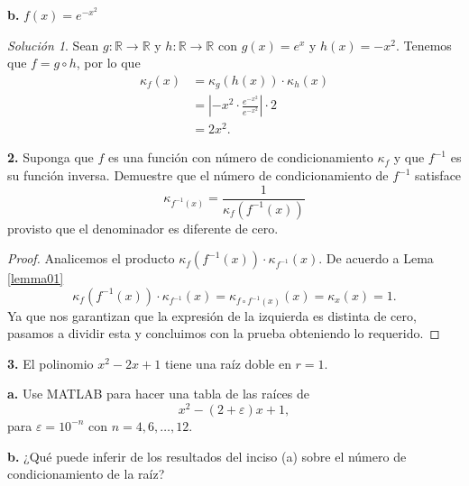 \documentclass{article}
\newenvironment{statement}[1]{\smallskip\noindent\color[rgb]{1.00,0.00,0.50} {\bf #1.}}{}
\theoremstyle{definition}
\theoremstyle{remark}
\newtheorem*{solution}{Soluci\'on}
\newcommand{\BR}{\mathbb R}
\begin{document}
\begin{statement}{b}
  $f(x) = e^{-x^2}$
\end{statement}

\begin{solution}
  Sean $g: \BR \to \BR$ y $h: \BR \to \BR$ con $g(x) = e^x$ y $h(x) = -x^2$.
  Tenemos que $f = g \circ h$, por lo que
  \begin{align*}
    \kappa_f(x) &= \kappa_g(h(x)) \cdot \kappa_h(x) \\
    &= \left|-x^2 \cdot \frac{e^{-x^2}}{e^{-x^2}}\right|\cdot 2 \\
    &= 2x^2.
  \end{align*}
\end{solution}

\begin{statement}{2}
  Suponga que $f$ es una funci\'on con n\'umero de condicionamiento
  $\kappa_f$ y que $f^{-1}$ es su funci\'on inversa. Demuestre que el n\'umero
  de condicionamiento de $f^{-1}$ satisface
  \[
    \kappa_{f^{-1}(x)} = \frac{1}{\kappa_f(f^{-1}(x))}
  \]
  provisto que el denominador es diferente de cero.
\end{statement}

\begin{proof}
  Analicemos el producto $\kappa_f(f^{-1}(x)) \cdot \kappa_{f^{-1}}(x)$.
  De acuerdo a Lema \ref{lemma01}
  \[
    \kappa_f(f^{-1}(x)) \cdot \kappa_{f^{-1}}(x) = \kappa_{f \circ f^{-1}(x)}(x) = \kappa_x(x) = 1.
  \]
  Ya que nos garantizan que la expresi\'on de la izquierda es distinta de cero,
  pasamos a dividir esta y concluimos con la prueba obteniendo lo requerido.
\end{proof}

\begin{statement}{3}
  El polinomio $x^2 - 2x + 1$ tiene una ra\'iz doble en $r = 1$.
\end{statement}

\begin{statement}{a}
  Use MATLAB para hacer una tabla de las ra\'ices de
  \[
    x^2 - (2 + \varepsilon)x + 1,  
  \]
  para $\varepsilon = 10^{-n}$ con $n = 4, 6, \dots, 12$.
\end{statement}

\begin{statement}{b}
  ¿Qu\'e puede inferir de los resultados del inciso (a) sobre el n\'umero de
  condicionamiento de la ra\'iz?
\end{statement}
\end{document}

